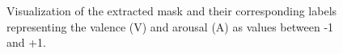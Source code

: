 \begin{figure}[ht]
  \hfill
  \hfill
  \hfill
  \caption{Visualization of the extracted mask and their corresponding labels representing the valence (V) and arousal (A) as values between -1 and +1.}
  \label{fig:MethodologyExtractionMask}
\end{figure}

